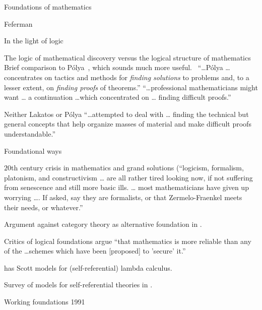 \begin{plSection}{Foundations of mathematics}
\begin{plSection}{Feferman}
\begin{plSection}{In the light of logic}
\begin{plSection}{The logic of mathematical discovery 
versus the logical structure of mathematics}
Brief comparison to 
P\'{o}lya~\cite[ch~3,sec~7]{Feferman:1998:LightOfLogic},
which sounds much more useful.~\cite{Polya:1957:SolveIt,
Polya:1965:MathDiscovery,Polya:1968:PlausibleReasoning}
``\ldots P\'{o}lya \ldots concentrates on tactics and methods
for \textit{finding solutions} to problems and, 
to a lesser extent,
on \textit{finding proofs} of theorems.''
\hfill\break
``\ldots professional mathematicians might want \ldots
a continuation \ldots which concentrated on \ldots
finding difficult proofs.''

Neither Lakatos or P\'{o}lya ``\ldots attempted to deal with 
\ldots
finding the technical but general concepts that 
help organize masses of material and make difficult 
proofs understandable.''

\end{plSection}%
\begin{plSection}{Foundational ways}
\label{sec:Foundational_ways}

\cite[ch~4 ``Foundational ways'']{Feferman:1998:LightOfLogic}

$20$th century crisis in mathematics and grand solutions 
(``logicism, formalism, platonism, and constructivism \ldots
are all rather tired looking now, if not suffering from
senescence and still more basic ills. \ldots
most mathematicians have given up worrying \dots .
If asked, say they are formalists, or that
Zermelo-Fraenkel meets their needs, or whatever.''

Argument against category theory as alternative 
foundation in \cite{Feferman:1977:CategoricalFoundations}.

Critics of logical foundations argue ``that mathematics
is more reliable than any of the \ldots schemes which have been
[proposed] to 'secure' it.''

\cite[ch~4, p~99]{Feferman:1998:LightOfLogic} has
Scott models for (self-referential) lambda 
calculus.~\cite{Scott:1972:ContinuousLattices,
Scott:1976:DataTypesAsLattices}

Survey of models for self-referential theories in 
\cite{Feferman:1984:TypeFreeTheoriesI}.

\end{plSection}%
\begin{plSection}{Working foundations 1991}
\label{sec:Working_foundations_1991}


\end{plSection}
\end{plSection}
\end{plSection}
\end{plSection}
